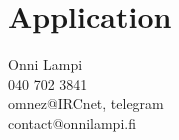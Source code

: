 \documentclass[a4paper, 12pt, english]{report}
\begin{document}
\chapter{Application}
Onni Lampi\\
040 702 3841\\
omnez@IRCnet, telegram\\
contact@onnilampi.fi
\end{document}
